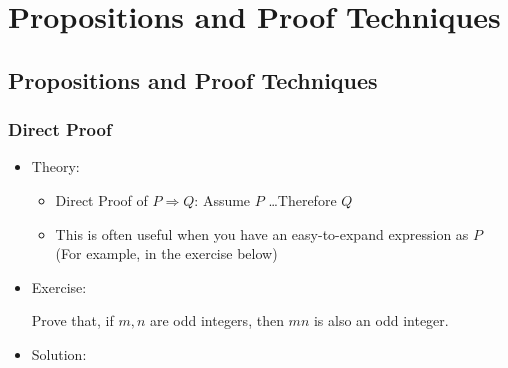 \documentclass[9pt]{beamer}
\title{\themidterm}
\author{\theauthors}
\institute{\theorganization}
\date{\thedate}
\begin{document}

\begin{frame}[fragile]
  \titlepage
\end{frame}


\section{Propositions and Proof Techniques}
\subsection{Propositions and Proof Techniques}

\begin{frame}[fragile]
  \frametitle{Direct Proof}
     \begin{itemize}
        \item Theory:
        \begin{itemize}
            \item Direct Proof of $P \Rightarrow Q$: Assume $P$ \dots Therefore $Q$
            \item This is often useful when you have an easy-to-expand expression as $P$ (For example, in the exercise below)
        \end{itemize}
        \item Exercise:

            Prove that, if $m, n$ are odd integers, then $mn$ is also an odd integer.
            
       \item Solution:
    \end{itemize}   
\end{frame}
\end{document}
